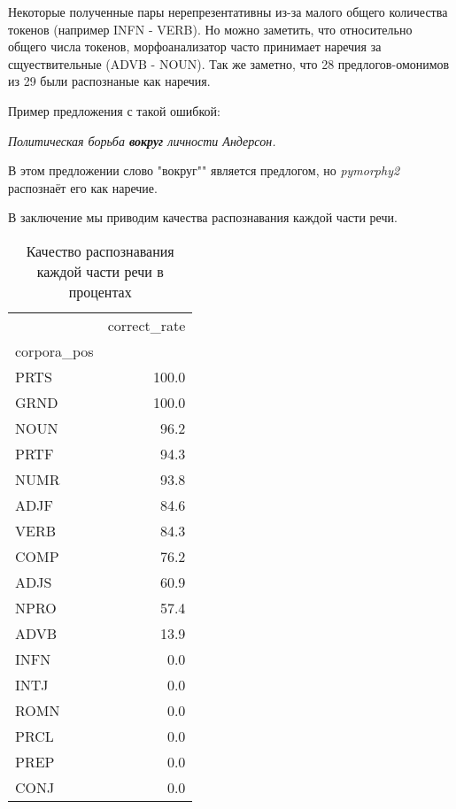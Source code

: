 \documentclass[a4paper,14pt]{article}
\begin{document}
	Некоторые полученные пары нерепрезентативны из-за малого общего количества токенов (например INFN - VERB). Но можно заметить, что относительно общего числа токенов, морфоанализатор часто принимает наречия за сщуествительные (ADVB - NOUN). Так же заметно, что 28 предлогов-омонимов из 29 были распознаные как наречия.
	

	Пример предложения с такой ошибкой:
	\begin{center}
	\textit{Политическая борьба \textbf{вокруг} личности Андерсон.}
	\end{center}
	В этом предложении слово "вокруг"" является предлогом, но \textit{pymorphy2} распознаёт его как наречие.

	В заключение мы приводим качества распознавания каждой части речи.
 	
	\begin{table}[h!]
		\begin{center}
			\begin{tabular}{lr}
			\toprule
			{} &  correct\_rate \\
			corpora\_pos &               \\
			\midrule
			PRTS        &         100.0 \\
			GRND        &         100.0 \\
			NOUN        &          96.2 \\
			PRTF        &          94.3 \\
			NUMR        &          93.8 \\
			ADJF        &          84.6 \\
			VERB        &          84.3 \\
			COMP        &          76.2 \\
			ADJS        &          60.9 \\
			NPRO        &          57.4 \\
			ADVB        &          13.9 \\
			INFN        &           0.0 \\
			INTJ        &           0.0 \\
			ROMN        &           0.0 \\
			PRCL        &           0.0 \\
			PREP        &           0.0 \\
			CONJ        &           0.0 \\
			\bottomrule
			\end{tabular}
			\caption{Качество распознавания каждой части речи в процентах}
		\end{center}
	\end{table}
	
\end{document}
